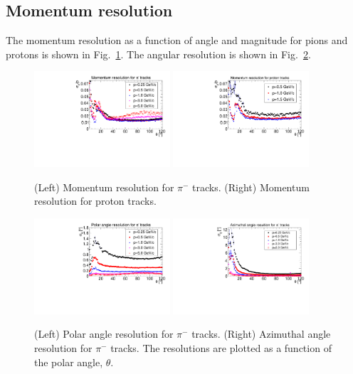 \subsection{Momentum resolution}

The momentum resolution as a function of angle and magnitude for pions and 
protons is shown in Fig.~\ref{fig:dp_p}.  The angular resolution is shown in 
Fig.~\ref{fig:angle res}.


\begin{figure}[tbp]
\begin{center}
\includegraphics[width=0.45\textwidth]{figures/PionMomentumResolution.pdf}
\includegraphics[width=0.45\textwidth]{figures/ProtonMomentumResolution.pdf}
\caption{\label{fig:dp_p} (Left) Momentum resolution for $\pi^-$ tracks.
(Right) Momentum resolution for proton tracks.}
\end{center}
\end{figure}

\begin{figure}[tbp]
\begin{center}
\includegraphics[width=0.45\textwidth]{figures/PionThetaResolution.pdf}
\includegraphics[width=0.45\textwidth]{figures/PionPhiResolution.pdf}
\caption{\label{fig:angle res} (Left) Polar angle resolution for $\pi^-$ tracks.
(Right) Azimuthal angle resolution for $\pi^-$ tracks.
The resolutions are plotted as a function of the polar angle, $\theta$.}
\end{center}
\end{figure}


